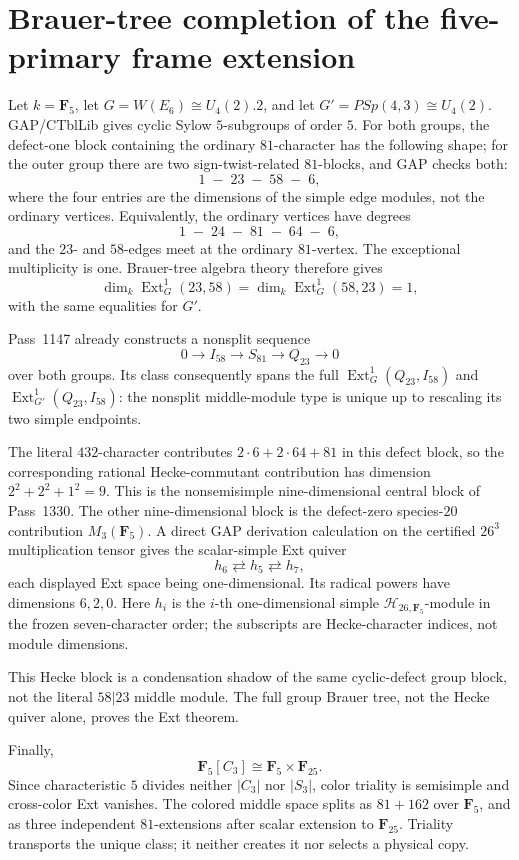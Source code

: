 \section{Brauer-tree completion of the five-primary frame extension}
\label{sec:pass1335-brauer-tree}

Let \(k=\mathbf F_5\), let \(G=W(E_6)\cong U_4(2).2\), and let
\(G'=PSp(4,3)\cong U_4(2)\). GAP/CTblLib gives cyclic Sylow \(5\)-subgroups
of order \(5\). For both groups, the defect-one block containing the
ordinary \(81\)-character has the following shape; for the outer group there
are two sign-twist-related \(81\)-blocks, and GAP checks both:
\[
  1\;-\;23\;-\;58\;-\;6,
\]
where the four entries are the dimensions of the simple edge modules, not the
ordinary vertices.
Equivalently, the ordinary vertices have degrees
\[
  1\;-\;24\;-\;81\;-\;64\;-\;6,
\]
and the \(23\)- and \(58\)-edges meet at the ordinary \(81\)-vertex. The
exceptional multiplicity is one. Brauer-tree algebra theory therefore gives
\[
 \dim_k\operatorname{Ext}^1_G(23,58)
 =\dim_k\operatorname{Ext}^1_G(58,23)=1,
\]
with the same equalities for \(G'\).

Pass~1147 already constructs a nonsplit sequence
\[
 0\longrightarrow I_{58}\longrightarrow S_{81}
 \longrightarrow Q_{23}\longrightarrow0
\]
over both groups. Its class consequently spans the full
\(\operatorname{Ext}^1_G(Q_{23},I_{58})\) and
\(\operatorname{Ext}^1_{G'}(Q_{23},I_{58})\): the nonsplit middle-module
type is unique up to rescaling its two simple endpoints.

The literal \(432\)-character contributes \(2\cdot6+2\cdot64+81\) in this
defect block, so the corresponding rational Hecke-commutant contribution has
dimension \(2^2+2^2+1^2=9\). This is the nonsemisimple nine-dimensional
central block of Pass~1330. The other nine-dimensional block is the
defect-zero species-\(20\) contribution \(M_3(\mathbf F_5)\). A direct GAP
derivation calculation on the certified \(26^3\) multiplication tensor gives
the scalar-simple Ext quiver
\[
 h_6\rightleftarrows h_5\rightleftarrows h_7,
\]
each displayed Ext space being one-dimensional. Its radical powers have
dimensions \(6,2,0\). Here \(h_i\) is the \(i\)-th one-dimensional simple
\(\mathcal H_{26,\mathbf F_5}\)-module in the frozen seven-character order;
the subscripts are Hecke-character indices, not module dimensions.

This Hecke block is a condensation shadow of the same cyclic-defect group
block, not the literal \(58|23\) middle module. The full group Brauer tree,
not the Hecke quiver alone, proves the Ext theorem.

Finally,
\[
 \mathbf F_5[C_3]\cong\mathbf F_5\times\mathbf F_{25}.
\]
Since characteristic \(5\) divides neither \(|C_3|\) nor \(|S_3|\), color
triality is semisimple and cross-color Ext vanishes. The colored middle
space splits as \(81+162\) over \(\mathbf F_5\), and as three independent
\(81\)-extensions after scalar extension to \(\mathbf F_{25}\). Triality
transports the unique class; it neither creates it nor selects a physical
copy.
